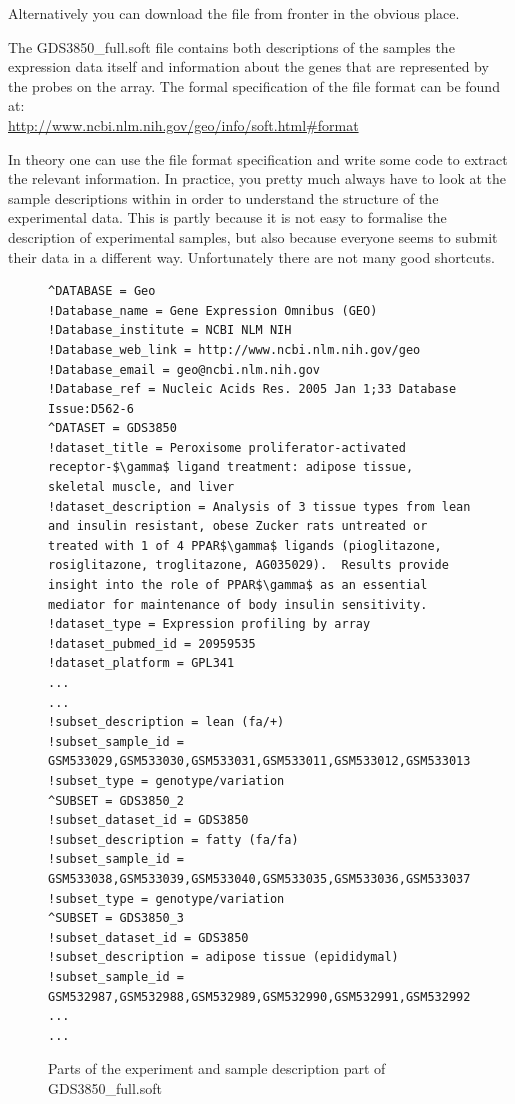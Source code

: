 \documentclass[11pt]{article}
\begin{document}
Alternatively you can download the file from fronter in the obvious place.

The GDS3850\_full.soft file contains both descriptions of the samples
the expression data itself and information about the genes that are
represented by the probes on the array. The formal specification of the
file format can be found at:\\
\url{http://www.ncbi.nlm.nih.gov/geo/info/soft.html#format}

In theory one can use the file format specification and write some code
to extract the relevant information. In practice, you pretty much always
have to look at the sample descriptions within in order to understand
the structure of the experimental data. This is partly because it is
not easy to formalise the description of experimental samples, but also
because everyone seems to submit their data in a different way. Unfortunately
there are not many good shortcuts.

\begin{figure}[ht]
\begin{Verbatim}[fontsize=\small]
^DATABASE = Geo
!Database_name = Gene Expression Omnibus (GEO)
!Database_institute = NCBI NLM NIH
!Database_web_link = http://www.ncbi.nlm.nih.gov/geo
!Database_email = geo@ncbi.nlm.nih.gov
!Database_ref = Nucleic Acids Res. 2005 Jan 1;33 Database Issue:D562-6
^DATASET = GDS3850
!dataset_title = Peroxisome proliferator-activated receptor-$\gamma$ ligand treatment: adipose tissue, skeletal muscle, and liver
!dataset_description = Analysis of 3 tissue types from lean and insulin resistant, obese Zucker rats untreated or treated with 1 of 4 PPAR$\gamma$ ligands (pioglitazone, rosiglitazone, troglitazone, AG035029).  Results provide insight into the role of PPAR$\gamma$ as an essential mediator for maintenance of body insulin sensitivity.
!dataset_type = Expression profiling by array
!dataset_pubmed_id = 20959535
!dataset_platform = GPL341
...
...
!subset_description = lean (fa/+)
!subset_sample_id = GSM533029,GSM533030,GSM533031,GSM533011,GSM533012,GSM533013,GSM532993,GSM532994,GSM532995
!subset_type = genotype/variation
^SUBSET = GDS3850_2
!subset_dataset_id = GDS3850
!subset_description = fatty (fa/fa)
!subset_sample_id = GSM533038,GSM533039,GSM533040,GSM533035,GSM533036,GSM533037,GSM533032,GSM533033,GSM533034,GSM533023,GSM533024,GSM533025,GSM533026,GSM533027,GSM533028,GSM533020,GSM533021,GSM533022,GSM533017,GSM533018,GSM533019,GSM533014,GSM533015,GSM533016,GSM533005,GSM533006,GSM533007,GSM533008,GSM533009,GSM533010,GSM533002,GSM533003,GSM533004,GSM532999,GSM533000,GSM533001,GSM532996,GSM532997,GSM532998,GSM532987,GSM532988,GSM532989,GSM532990,GSM532991,GSM532992
!subset_type = genotype/variation
^SUBSET = GDS3850_3
!subset_dataset_id = GDS3850
!subset_description = adipose tissue (epididymal)
!subset_sample_id = GSM532987,GSM532988,GSM532989,GSM532990,GSM532991,GSM532992,GSM532993,GSM532994,GSM532995,GSM532996,GSM532997,GSM532998,GSM532999,GSM533000,GSM533001,GSM533002,GSM533003,GSM533004
...
...  
\end{Verbatim}
\caption{Parts of the experiment and sample description part of GDS3850\_full.soft}
\label{soft1}
\end{figure}
\end{document}
